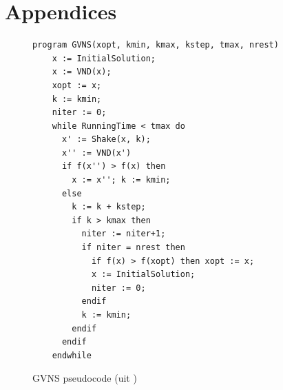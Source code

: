 \documentclass[pdftex,12pt,a4paper]{article}
\begin{document}
\newpage
\section{Appendices}
\begin{figure}[h]
\begin{verbatim}
program GVNS(xopt, kmin, kmax, kstep, tmax, nrest)
    x := InitialSolution;
    x := VND(x);
    xopt := x;
    k := kmin;
    niter := 0;
    while RunningTime < tmax do
      x' := Shake(x, k);
      x'' := VND(x')
      if f(x'') > f(x) then
        x := x''; k := kmin;
      else
        k := k + kstep;
        if k > kmax then
          niter := niter+1;
          if niter = nrest then
            if f(x) > f(xopt) then xopt := x;
            x := InitialSolution;
            niter := 0;
          endif
          k := kmin;
        endif
      endif
    endwhile
\end{verbatim}
\caption{GVNS pseudocode (uit \cite{Urosevic})}
\label{apx:gvns_pseudocode}
\end{figure}
\end{document}
